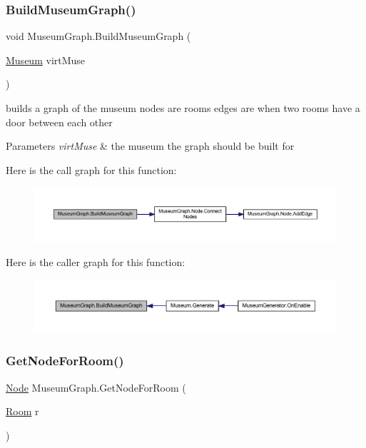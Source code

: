 \subsubsection{\texorpdfstring{Build\+Museum\+Graph()}{BuildMuseumGraph()}}
{\footnotesize\ttfamily void Museum\+Graph.\+Build\+Museum\+Graph (\begin{DoxyParamCaption}\item[{\mbox{\hyperlink{class_museum}{Museum}}}]{virt\+Muse }\end{DoxyParamCaption})}



builds a graph of the museum nodes are rooms edges are when two rooms have a door between each other 


\begin{DoxyParams}{Parameters}
{\em virt\+Muse} & the museum the graph should be built for\\
\hline
\end{DoxyParams}
Here is the call graph for this function\+:\nopagebreak
\begin{figure}[H]
\begin{center}
\leavevmode
\includegraphics[width=350pt]{class_museum_graph_a36a26248bb9c304f8e67c60eb6d517f5_cgraph}
\end{center}
\end{figure}
Here is the caller graph for this function\+:
\nopagebreak
\begin{figure}[H]
\begin{center}
\leavevmode
\includegraphics[width=350pt]{class_museum_graph_a36a26248bb9c304f8e67c60eb6d517f5_icgraph}
\end{center}
\end{figure}
\mbox{\label{class_museum_graph_a82509a5eb8dd2020aaee17261bedb974}} 
\subsubsection{\texorpdfstring{Get\+Node\+For\+Room()}{GetNodeForRoom()}}
{\footnotesize\ttfamily \mbox{\hyperlink{class_museum_graph_1_1_node}{Node}} Museum\+Graph.\+Get\+Node\+For\+Room (\begin{DoxyParamCaption}\item[{\mbox{\hyperlink{class_room}{Room}}}]{r }\end{DoxyParamCaption})}



